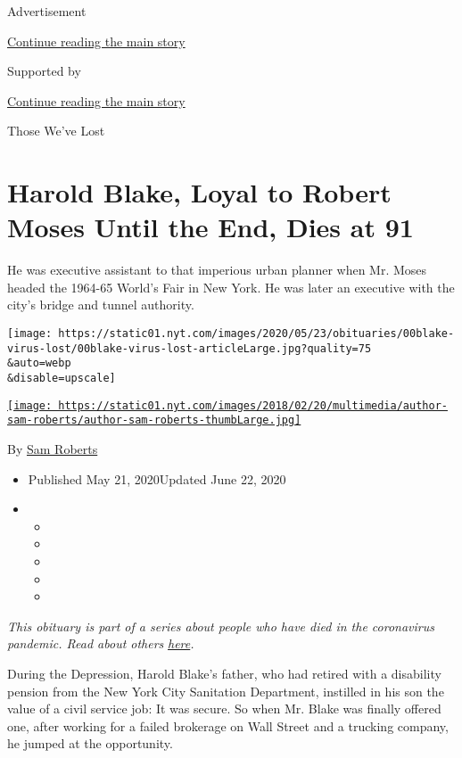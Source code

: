 Advertisement

\protect\hyperlink{after-top}{Continue reading the main story}

Supported by

\protect\hyperlink{after-sponsor}{Continue reading the main story}

Those We've Lost

\hypertarget{harold-blake-loyal-to-robert-moses-until-the-end-dies-at-91}{%
\section{Harold Blake, Loyal to Robert Moses Until the End, Dies at
91}\label{harold-blake-loyal-to-robert-moses-until-the-end-dies-at-91}}

He was executive assistant to that imperious urban planner when Mr.
Moses headed the 1964-65 World's Fair in New York. He was later an
executive with the city's bridge and tunnel authority.

\texttt{[image: https://static01.nyt.com/images/2020/05/23/obituaries/00blake-virus-lost/00blake-virus-lost-articleLarge.jpg?quality=75\\\&auto=webp\\\&disable=upscale]}

\href{https://www.nytimes.com/by/sam-roberts}{\texttt{[image: https://static01.nyt.com/images/2018/02/20/multimedia/author-sam-roberts/author-sam-roberts-thumbLarge.jpg]}}

By \href{https://www.nytimes.com/by/sam-roberts}{Sam Roberts}

\begin{itemize}
\item
  Published May 21, 2020Updated June 22, 2020
\item
  \begin{itemize}
  \item
  \item
  \item
  \item
  \item
  \end{itemize}
\end{itemize}

\emph{This obituary is part of a series about people who have died in
the coronavirus pandemic. Read about others}
\href{https://www.nytimes.com/series/people-who-have-died-of-the-coronavirus}{\emph{here}}\emph{.}

During the Depression, Harold Blake's father, who had retired with a
disability pension from the New York City Sanitation Department,
instilled in his son the value of a civil service job: It was secure. So
when Mr. Blake was finally offered one, after working for a failed
brokerage on Wall Street and a trucking company, he jumped at the
opportunity.

